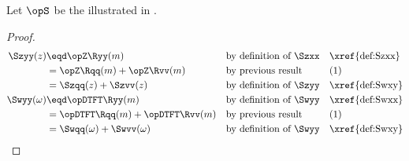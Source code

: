\begin{corollary}
\label{cor:xvy}
Let $\opS$ be the  illustrated in .
\end{corollary}
\begin{proof}
\begin{align*}
  \Szyy(z)
    &\eqd \opZ\Ryy(m)
    && \text{by definition of $\Szxx$}
    && \text{\xref{def:Szxx}}
  \\&= \opZ\Rqq(m) + \opZ\Rvv(m)
    && \text{by previous result}
    && \text{(1)}
  \\&= \Szqq(z) + \Szvv(z)
    && \text{by definition of $\Szyy$}
    && \text{\xref{def:Swxy}}
  \\
  \Swyy(\omega)
    &\eqd \opDTFT\Ryy(m)
    && \text{by definition of $\Swyy$}
    && \text{\xref{def:Swxx}}
  \\&= \opDTFT\Rqq(m) + \opDTFT\Rvv(m)
    && \text{by previous result}
    && \text{(1)}
  \\&= \Swqq(\omega) + \Swvv(\omega)
    && \text{by definition of $\Swyy$}
    && \text{\xref{def:Swxy}}
\end{align*}
\end{proof}

